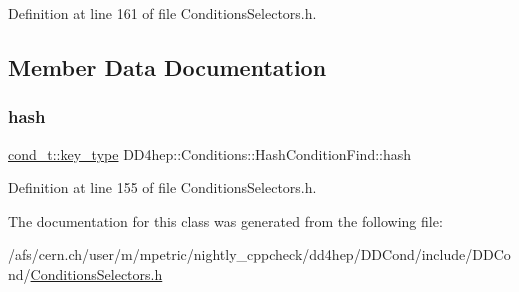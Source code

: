 Definition at line 161 of file Conditions\+Selectors.\+h.



\subsection{Member Data Documentation}
\hypertarget{class_d_d4hep_1_1_conditions_1_1_hash_condition_find_a9be86da61865f479161109ec62efa26a}{}\label{class_d_d4hep_1_1_conditions_1_1_hash_condition_find_a9be86da61865f479161109ec62efa26a} 
\subsubsection{\texorpdfstring{hash}{hash}}
{\footnotesize\ttfamily \hyperlink{class_d_d4hep_1_1_conditions_1_1_condition_a7528efa762e8cc072ef80ea67c3531f9}{cond\+\_\+t\+::key\+\_\+type} D\+D4hep\+::\+Conditions\+::\+Hash\+Condition\+Find\+::hash\hspace{0.3cm}{\ttfamily [private]}}



Definition at line 155 of file Conditions\+Selectors.\+h.



The documentation for this class was generated from the following file\+:\begin{DoxyCompactItemize}
\item 
/afs/cern.\+ch/user/m/mpetric/nightly\+\_\+cppcheck/dd4hep/\+D\+D\+Cond/include/\+D\+D\+Cond/\hyperlink{_conditions_selectors_8h}{Conditions\+Selectors.\+h}\end{DoxyCompactItemize}
